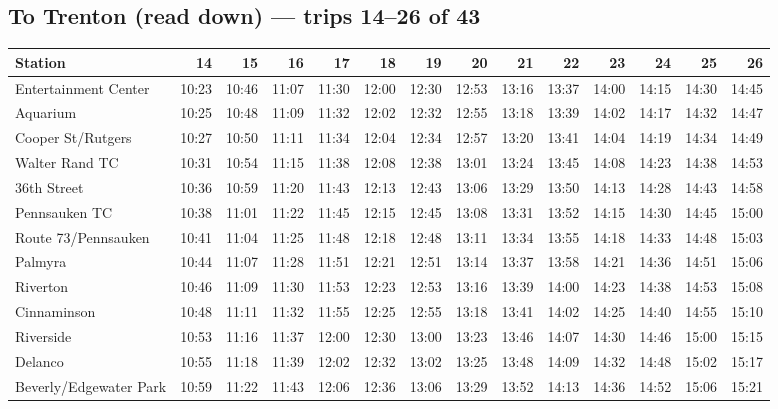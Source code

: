 \subsection*{To Trenton (read down) --- trips 14--26 of 43}
\begin{center}\footnotesize\setlength{\tabcolsep}{3pt}\begin{tabular}{@{}lrrrrrrrrrrrrr@{}}\toprule
Station & 14 & 15 & 16 & 17 & 18 & 19 & 20 & 21 & 22 & 23 & 24 & 25 & 26 \\\midrule
Entertainment Center & 10:23 & 10:46 & 11:07 & 11:30 & 12:00 & 12:30 & 12:53 & 13:16 & 13:37 & 14:00 & 14:15 & 14:30 & 14:45 \\
Aquarium & 10:25 & 10:48 & 11:09 & 11:32 & 12:02 & 12:32 & 12:55 & 13:18 & 13:39 & 14:02 & 14:17 & 14:32 & 14:47 \\
Cooper St/Rutgers & 10:27 & 10:50 & 11:11 & 11:34 & 12:04 & 12:34 & 12:57 & 13:20 & 13:41 & 14:04 & 14:19 & 14:34 & 14:49 \\
Walter Rand TC & 10:31 & 10:54 & 11:15 & 11:38 & 12:08 & 12:38 & 13:01 & 13:24 & 13:45 & 14:08 & 14:23 & 14:38 & 14:53 \\
36th Street & 10:36 & 10:59 & 11:20 & 11:43 & 12:13 & 12:43 & 13:06 & 13:29 & 13:50 & 14:13 & 14:28 & 14:43 & 14:58 \\
Pennsauken TC & 10:38 & 11:01 & 11:22 & 11:45 & 12:15 & 12:45 & 13:08 & 13:31 & 13:52 & 14:15 & 14:30 & 14:45 & 15:00 \\
Route 73/Pennsauken & 10:41 & 11:04 & 11:25 & 11:48 & 12:18 & 12:48 & 13:11 & 13:34 & 13:55 & 14:18 & 14:33 & 14:48 & 15:03 \\
Palmyra & 10:44 & 11:07 & 11:28 & 11:51 & 12:21 & 12:51 & 13:14 & 13:37 & 13:58 & 14:21 & 14:36 & 14:51 & 15:06 \\
Riverton & 10:46 & 11:09 & 11:30 & 11:53 & 12:23 & 12:53 & 13:16 & 13:39 & 14:00 & 14:23 & 14:38 & 14:53 & 15:08 \\
Cinnaminson & 10:48 & 11:11 & 11:32 & 11:55 & 12:25 & 12:55 & 13:18 & 13:41 & 14:02 & 14:25 & 14:40 & 14:55 & 15:10 \\
Riverside & 10:53 & 11:16 & 11:37 & 12:00 & 12:30 & 13:00 & 13:23 & 13:46 & 14:07 & 14:30 & 14:46 & 15:00 & 15:15 \\
Delanco & 10:55 & 11:18 & 11:39 & 12:02 & 12:32 & 13:02 & 13:25 & 13:48 & 14:09 & 14:32 & 14:48 & 15:02 & 15:17 \\
Beverly/Edgewater Park & 10:59 & 11:22 & 11:43 & 12:06 & 12:36 & 13:06 & 13:29 & 13:52 & 14:13 & 14:36 & 14:52 & 15:06 & 15:21 \\

\end{tabular}
\end{center}
